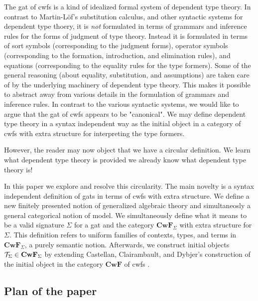 \documentclass{lmcs}
\def\Cwf{\mathbf{CwF}}
\begin{document}
The gat of cwfs is a kind of idealized formal system of dependent type theory. In contrast to Martin-Löf's substitution calculus, and other syntactic systems for dependent type thoery, it is {\em not} formulated in terms of grammars and inference rules for the forms of judgment of type theory. Instead it is formulated in terms of sort symbols (corresponding to the judgment forms), operator symbols (corresponding to the formation, introduction, and elimination rules), and equations (corresponding to the equality rules for the type formers). Some of the general reasoning (about equality, substitution, and assumptions) are taken care of by the underlying machinery of dependent type theory. This makes it possible to abstract away from various details in the formulation of grammars and inference rules. In contrast to the various syntactic systems, we would like to argue that the gat of cwfs appears to be "canonical". We may define dependent type theory in a syntax independent way as the initial object in a category of cwfs with extra structure for interpreting the type formers. 

However, the reader may now object that we have a circular definition. We learn what dependent type theory is provided we already know what dependent type theory is!

In this paper we explore and resolve this circularity. The main novelty is a syntax independent definition of gats in terms of cwfs with extra structure. We define a new finitely presented notion of generalized algebraic theory and simultaneosly a general categorical notion of model. We simultaneously define what it means to be a valid signature $\Sigma$ for a gat and the category $\Cwf_\Sigma$ with extra structure for $\Sigma$. This definition refers to uniform families of contexts, types, and terms in $\Cwf_\Sigma$, a purely semantic notion. Afterwards, we construct initial objects $\T_\Sigma \in \Cwf_\Sigma$ by extending Castellan, Clairambault, and Dybjer's  construction of the initial object in the category $\Cwf$ of cwfs \cite{castellan:tlca2015,castellan:lmcs}.


\subsection*{Plan of the paper}
\end{document}
